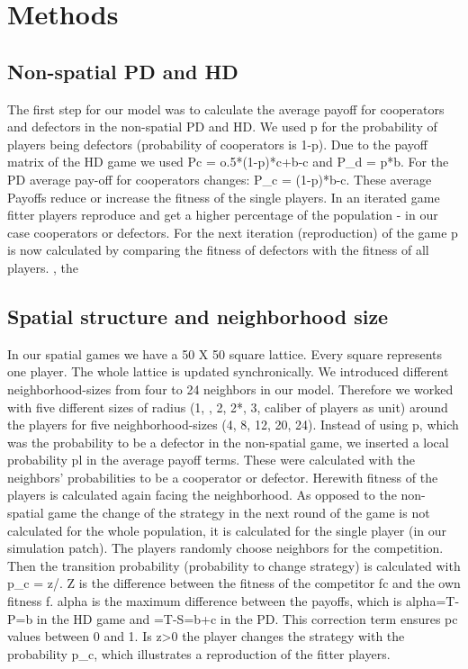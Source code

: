 \section{Methods}

\subsection{Non-spatial PD and HD}

The first step for our model was to calculate the average payoff for cooperators and defectors in the non-spatial PD and HD. We used p for the probability of players being defectors (probability of cooperators is 1-p). Due to the payoff matrix of the HD game we used Pc = o.5*(1-p)*c+b-c and P_{d} = p*b. For the PD average pay-off for cooperators changes: P_{c} = (1-p)*b-c. These average Payoffs reduce or increase the fitness of the single players. In an iterated game fitter players reproduce and get a higher percentage of the population - in our case cooperators or defectors. For the next iteration (reproduction) of the game p is now calculated by comparing the fitness of defectors with the fitness of all players.
, the 
\subsection{Spatial structure and neighborhood size}
In our spatial games we have a 50 X 50 square lattice. Every square represents one player. The whole lattice is updated synchronically. We introduced different neighborhood-sizes from four to 24 neighbors in our model. Therefore we worked with five different sizes of radius (1, , 2, 2*, 3, caliber of players as unit) around the players for five neighborhood-sizes (4, 8, 12, 20, 24). Instead of using p, which was the probability to be a defector in the non-spatial game, we inserted a local probability pl in the average payoff terms. These were calculated with the neighbors' probabilities to be a cooperator or defector. Herewith fitness of the players is calculated again facing the neighborhood. As opposed to the non-spatial game the change of the strategy in the next round of the game is not calculated for the whole population, it is calculated for the single player (in our simulation patch). The players randomly choose neighbors for the competition. Then the transition probability (probability to change strategy) is calculated with p_{c} = z/\alpha. Z is the difference between the fitness of the competitor fc and the own fitness f. alpha is the maximum difference between the payoffs, which is alpha=T-P=b in the HD game and \alpha=T-S=b+c in the PD. This correction term ensures pc values between 0 and 1. Is z>0 the player changes the strategy with the probability p_{c}, which illustrates a reproduction of the fitter players.

